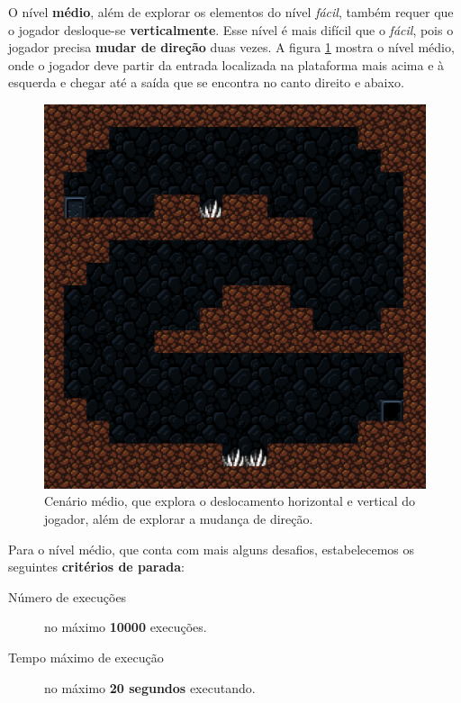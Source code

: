 O nível \textbf{médio}, além de explorar os elementos do nível \textit{fácil},
também requer que o jogador desloque-se \textbf{verticalmente}. Esse nível é
mais difícil que o \textit{fácil}, pois o jogador precisa \textbf{mudar de
direção} duas vezes. A figura \ref{fig:level2} mostra o nível médio, onde o
jogador deve partir da entrada localizada na plataforma mais acima e à
esquerda e chegar até a saída que se encontra no canto direito e abaixo.

\begin{figure}[H]
\centering
\includegraphics[width=\textwidth / 2]{fig/levels/level2.pdf}
\caption{Cenário médio, que explora o deslocamento horizontal e vertical do
    jogador, além de explorar a mudança de direção.}
\label{fig:level2}
\end{figure}

Para o nível médio, que conta com mais alguns desafios, estabelecemos os
seguintes \textbf{critérios de parada}:

\begin{description}
    \item [Número de execuções] no máximo \textbf{10000} execuções.
    \item [Tempo máximo de execução] no máximo \textbf{20 segundos} executando.
\end{description}

